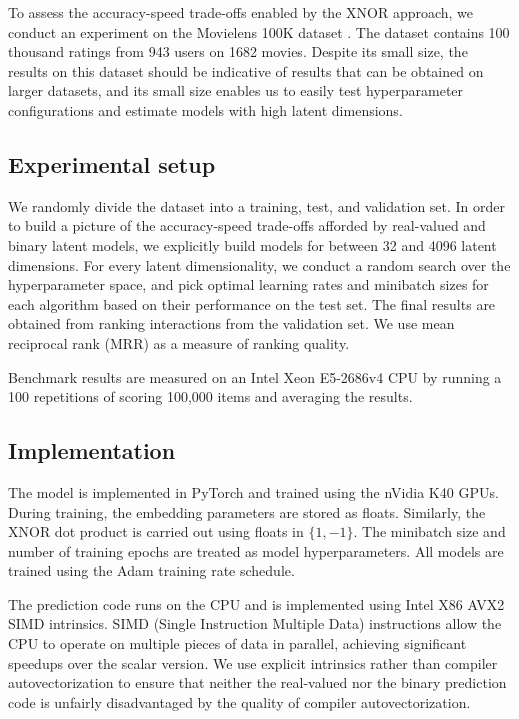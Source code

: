 \documentclass[sigchi]{acmart}
\begin{document}
To assess the accuracy-speed trade-offs enabled by the XNOR approach, we conduct an experiment on the Movielens 100K dataset \citep{harper2016movielens}. The dataset contains 100 thousand ratings from 943 users on 1682 movies. Despite its small size, the results on this dataset should be indicative of results that can be obtained on larger datasets, and its small size enables us to easily test hyperparameter configurations and estimate models with high latent dimensions.

\subsection{Experimental setup}
We randomly divide the dataset into a training, test, and validation set. In order to build a picture of the accuracy-speed trade-offs afforded by real-valued and binary latent models, we explicitly build models for between 32 and 4096 latent dimensions. For every latent dimensionality, we conduct a random search over the hyperparameter space, and pick optimal learning rates and minibatch sizes for each algorithm based on their performance on the test set. The final results are obtained from ranking interactions from the validation set. We use mean reciprocal rank (MRR) as a measure of ranking quality.

Benchmark results are measured on an Intel Xeon E5-2686v4 CPU by running a 100 repetitions of scoring 100,000 items and averaging the results.

\subsection{Implementation}
The model is implemented in PyTorch and trained using the nVidia K40 GPUs. During training, the embedding parameters are stored as floats. Similarly, the XNOR dot product is carried out using floats in $\{1, -1\}$. The minibatch size and number of training epochs are treated as model hyperparameters. All models are trained using the Adam training rate schedule. 

The prediction code runs on the CPU and is implemented using Intel X86 AVX2 SIMD intrinsics. SIMD (Single Instruction Multiple Data) instructions allow the CPU to operate on multiple pieces of data in parallel, achieving significant speedups over the scalar version. We use explicit intrinsics rather than compiler autovectorization to ensure that neither the real-valued nor the binary prediction code is unfairly disadvantaged by the quality of compiler autovectorization. 
\end{document}
